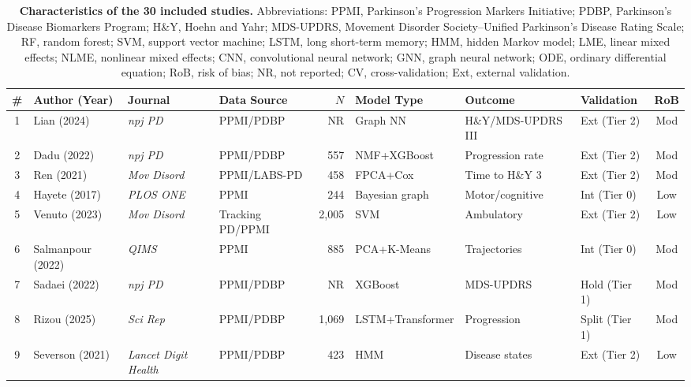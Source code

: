 \documentclass[11pt,a4paper]{article}
\begin{document}
\begin{landscape}
\begin{table}[p]
\centering
\caption{\textbf{Characteristics of the 30 included studies.} Abbreviations: PPMI, Parkinson's Progression Markers Initiative; PDBP, Parkinson's Disease Biomarkers Program; H\&Y, Hoehn and Yahr; MDS-UPDRS, Movement Disorder Society--Unified Parkinson's Disease Rating Scale; RF, random forest; SVM, support vector machine; LSTM, long short-term memory; HMM, hidden Markov model; LME, linear mixed effects; NLME, nonlinear mixed effects; CNN, convolutional neural network; GNN, graph neural network; ODE, ordinary differential equation; RoB, risk of bias; NR, not reported; CV, cross-validation; Ext, external validation.}
\label{tab:characteristics}
\small
\begin{tabularx}{\linewidth}{@{}clllrlllc@{}}
\toprule
\textbf{\#} & \textbf{Author (Year)} & \textbf{Journal} & \textbf{Data Source} & \textbf{$N$} & \textbf{Model Type} & \textbf{Outcome} & \textbf{Validation} & \textbf{RoB} \\
\midrule
1  & Lian (2024)       & \textit{npj PD}          & PPMI/PDBP         & NR    & Graph NN       & H\&Y/MDS-UPDRS III & Ext (Tier 2) & Mod \\
2  & Dadu (2022)       & \textit{npj PD}          & PPMI/PDBP         & 557   & NMF+XGBoost    & Progression rate   & Ext (Tier 2) & Mod \\
3  & Ren (2021)        & \textit{Mov Disord}      & PPMI/LABS-PD      & 458   & FPCA+Cox       & Time to H\&Y 3     & Ext (Tier 2) & Mod \\
4  & Hayete (2017)     & \textit{PLOS ONE}         & PPMI              & 244   & Bayesian graph & Motor/cognitive    & Int (Tier 0) & Low \\
5  & Venuto (2023)     & \textit{Mov Disord}      & Tracking PD/PPMI  & 2,005 & SVM            & Ambulatory         & Ext (Tier 2) & Low \\
6  & Salmanpour (2022) & \textit{QIMS}            & PPMI              & 885   & PCA+K-Means    & Trajectories       & Int (Tier 0) & Mod \\
7  & Sadaei (2022)     & \textit{npj PD}          & PPMI/PDBP         & NR    & XGBoost        & MDS-UPDRS          & Hold (Tier 1)& Mod \\
8  & Rizou (2025)      & \textit{Sci Rep}         & PPMI/PDBP         & 1,069 & LSTM+Transformer & Progression      & Split (Tier 1) & Mod \\
9  & Severson (2021)   & \textit{Lancet Digit Health} & PPMI/PDBP     & 423   & HMM            & Disease states     & Ext (Tier 2) & Low \\

\end{tabularx}
\end{table}
\end{landscape}
\end{document}

